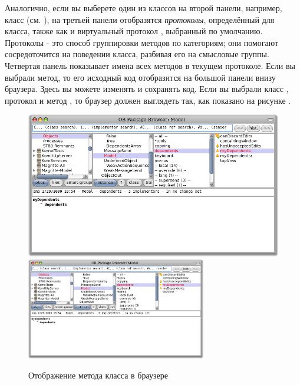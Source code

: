 \documentclass[a4paper,10pt,twoside]{book}
\begin{document}
Аналогично, если вы выберете один из классов на второй панели, например, класс  (см.  ), на третьей панели отобразятся \emph{протоколы}, определённый для класса, также как и виртуальный протокол , выбранный по умолчанию. 
Протоколы - это способ группировки методов по категориям; они помогают сосредоточится на поведении класса, разбивая его на смысловые группы.  
Четвертая панель показывает имена всех методов в текущем протоколе. 
Если вы выбрали метод, то его исходный код отобразится на большой панели внизу браузера. Здесь вы можете изменять и сохранять код.
Если вы выбрали класс ,  протокол  и метод , то браузер должен выглядеть так, как показано на рисунке  .

\begin{figure}[htbp]
   \centering
   \ifluluelse
	   {\includegraphics[width=\textwidth]{SystemBrowserMyDependents}}
	   {\includegraphics[width=0.7\textwidth]{SystemBrowserMyDependents}}
   \caption{Отображение метода  класса  в браузере
   }
\end{figure}

\end{document}

